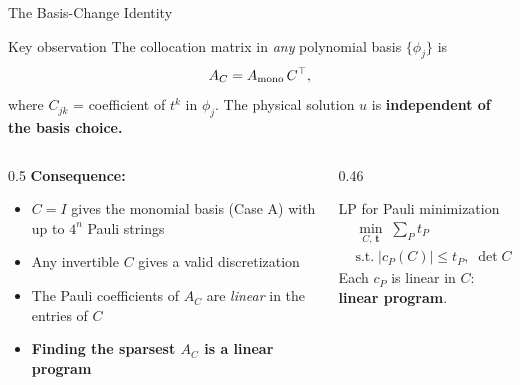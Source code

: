 \documentclass{beamer}
\begin{document}
\begin{frame}[shrink=12]{The Basis-Change Identity}

  \begin{block}{Key observation}
    The collocation matrix in \emph{any} polynomial basis $\{\phi_j\}$ is
    \[
      A_C = A_{\rm mono}\, C^\top,
    \]
    where $C_{jk}$ = coefficient of $t^k$ in $\phi_j$.
    The physical solution $u$ is \textbf{independent of the basis choice.}
  \end{block}

  \vspace{8pt}
  \begin{columns}
    \begin{column}{0.5\textwidth}
      \textbf{Consequence:}
      \begin{itemize}
        \item $C = I$ gives the monomial basis (Case A) with up to $4^n$ Pauli strings
        \item Any invertible $C$ gives a valid discretization
        \item The Pauli coefficients of $A_C$ are \emph{linear} in the entries of $C$
        \item[$\Rightarrow$] \textbf{Finding the sparsest $A_C$ is a linear program}
      \end{itemize}
    \end{column}
    \begin{column}{0.46\textwidth}
      \begin{alertblock}{LP for Pauli minimization}
        \vspace{-4pt}
        \[
          \begin{aligned}
            &\min_{C,\,\mathbf{t}}\;\textstyle\sum_{P} t_P \\
            &\text{s.t.}\; |c_P(C)| \le t_P,\;\det C \neq 0
          \end{aligned}
        \]
        \vspace{-4pt}
        Each $c_P$ is linear in $C$: \textbf{linear program}.
      \end{alertblock}
    \end{column}
  \end{columns}
\end{frame}
\end{document}
